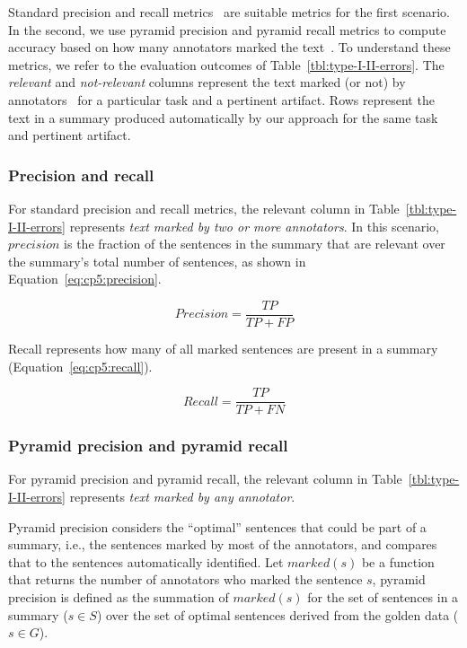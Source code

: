 Standard precision and recall metrics~\cite{Manning2009IR} are suitable metrics for the first scenario. In the second, we use pyramid precision and pyramid recall metrics
to compute accuracy based on how many annotators marked the text~\cite{Nenkova2004, Lotufo2012}. 
To understand these metrics, we refer to the evaluation outcomes of Table~\ref{tbl:type-I-II-errors}. 
The \textit{relevant} and \textit{not-relevant} columns represent the text 
marked (or not) by annotators~\cite{Lotufo2012} for a particular task and a pertinent artifact. Rows represent the text in a summary produced automatically by our approach for the same task and pertinent artifact.





\subsubsection{Precision and recall}


For standard precision and recall metrics, the relevant column in Table~\ref{tbl:type-I-II-errors} represents \textit{text marked by two or more annotators}. 
In this scenario, $precision$ is the fraction of the sentences
 in the summary that are relevant over the summary's total number of sentences, as shown in Equation~\ref{eq:cp5:precision}.


\begin{equation}
\label{eq:cp5:precision}    
    Precision = \frac{TP}{TP + FP}
\end{equation}

\vspace{2mm}
Recall represents how many of all marked sentences are present in a summary (Equation~\ref{eq:cp5:recall}).


\begin{equation}
\label{eq:cp5:recall}        
    Recall = \frac{TP}{TP + FN}
\end{equation}




\subsubsection{Pyramid precision and pyramid recall}


For pyramid precision and pyramid recall, the relevant column in Table~\ref{tbl:type-I-II-errors} represents \textit{text marked by any annotator}. 


Pyramid precision considers the ``optimal'' sentences that could be part of a summary, i.e., the sentences marked by most of the annotators, and compares that to the sentences  automatically identified. Let $marked(s)$ be a function that returns the number of annotators who marked the sentence $s$, pyramid precision is defined as 
the summation of $marked(s)$ for the set of sentences in a summary ($s \in S$) over the set of optimal sentences derived from the golden data ($s \in G$).



